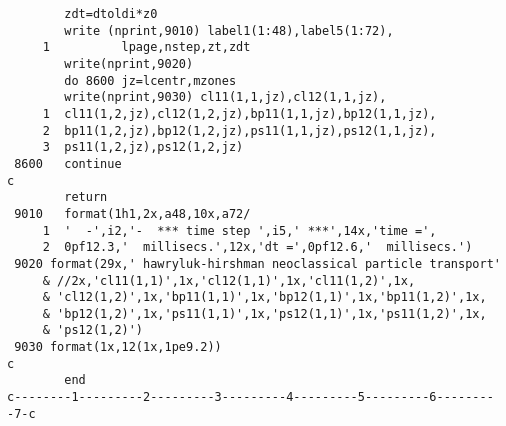 \begin{verbatim}
        zdt=dtoldi*z0
        write (nprint,9010) label1(1:48),label5(1:72),
     1          lpage,nstep,zt,zdt
        write(nprint,9020)
        do 8600 jz=lcentr,mzones
        write(nprint,9030) cl11(1,1,jz),cl12(1,1,jz),
     1  cl11(1,2,jz),cl12(1,2,jz),bp11(1,1,jz),bp12(1,1,jz),
     2  bp11(1,2,jz),bp12(1,2,jz),ps11(1,1,jz),ps12(1,1,jz),
     3  ps11(1,2,jz),ps12(1,2,jz)
 8600   continue
c
        return
 9010   format(1h1,2x,a48,10x,a72/
     1  '  -',i2,'-  *** time step ',i5,' ***',14x,'time =',
     2  0pf12.3,'  millisecs.',12x,'dt =',0pf12.6,'  millisecs.')
 9020 format(29x,' hawryluk-hirshman neoclassical particle transport'
     & //2x,'cl11(1,1)',1x,'cl12(1,1)',1x,'cl11(1,2)',1x,
     & 'cl12(1,2)',1x,'bp11(1,1)',1x,'bp12(1,1)',1x,'bp11(1,2)',1x,
     & 'bp12(1,2)',1x,'ps11(1,1)',1x,'ps12(1,1)',1x,'ps11(1,2)',1x,
     & 'ps12(1,2)')
 9030 format(1x,12(1x,1pe9.2))
c
        end
c--------1---------2---------3---------4---------5---------6---------7-c
\end{verbatim}

